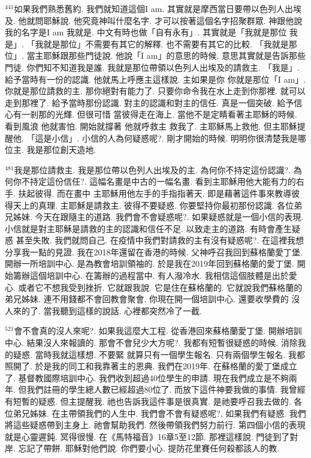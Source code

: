 \documentclass{book}
\begin{document}
$^{441}$如果我們熟悉舊約.
我們就知道這個I am.
其實就是摩西當日要帶以色列人出埃及.
他就問耶穌說.
他究竟神叫什麼名字.
才可以按著這個名字招聚群眾.
神跟他說 我的名字是I am 我就是.
中文有時也做「自有永有」.
其實就是「我就是那位 我是」.
「我就是那位」不需要有其它的解釋.
也不需要有其它的比較.
「我就是那位」.
當主耶穌跟那些門徒說.
他說「I am」的意思的時候.
意思其實就是告訴那些門徒.
你們知不知道我是誰.
我就是那位帶領以色列人出埃及的請救主.
「我是」.
給予當時有一份的認識.
他就馬上呼應主這樣說.
主如果是你 你就是那位「I am」.
你就是那位請救的主.
那你絕對有能力了.
只要你命令我在水上走到你那裡.
就可以走到那裡了.
給予當時那份認識.
對主的認識和對主的信任.
真是一個突破.
給予信心有一剎那的光輝.
但很可惜 當彼得走在海上.
當他不是定睛看著主耶穌的時候.
看到風浪 他就害怕.
開始就撐著 他就呼救主 救我了.
主耶穌馬上救他.
但主耶穌提醒他.
「這是小信」.
小信的人為何疑惑呢?.
剛才開始的時候.
明明你很清楚我是哪位主.
我是那位創天造地.

$^{481}$我是那位請救主.
我是那位帶以色列人出埃及的主.
為何你不持定這份認識?.
為何你不持定這份信任?.
這幅名畫是中古的一幅名畫.
看到主耶穌用他大能有力的右手.
扶起彼得.
而在畫中 主耶穌用他左手的手指指著天.
即是藉著這件事來教導彼得天上的真理.
主耶穌是請救主.
彼得不要疑惑.
你要堅持你最初那份認識.
各位弟兄姊妹.
今天在跟隨主的道路.
我們會不會疑惑呢?.
如果疑惑就是一個小信的表現.
小信就是對主耶穌是請救的主的認識和信任不足.
以致走主的道路.
有時會產生疑惑 甚至失敗.
我們就問自己.
在疫情中我們對請救的主有沒有疑惑呢?.
在這裡我想分享我一點的見證.
我在2018年還留在香港的時候.
父神呼召我回到蘇格蘭愛丁堡.
開辦一所培訓中心.
是為教會培訓領袖的.
於是我在2019年回到蘇格蘭的愛丁堡.
開始籌辦這個培訓中心.
在籌辦的過程當中.
有人潑冷水.
我相信這個肢體是出於愛心.
或者它不想我受到挫折.
它就跟我說.
它是住在蘇格蘭的.
它就說我們蘇格蘭的弟兄姊妹.
連不用錢都不會回教會聚會.
你現在開一個培訓中心.
還要收學費的 沒人來的了.
當我聽到這樣的說話.
心裡都突然冷了一截.

$^{521}$會不會真的沒人來呢?.
如果我這麼大工程.
從香港回來蘇格蘭愛丁堡.
開辦培訓中心.
結果沒人來報讀的.
那會不會兒少大方呢?.
我都有短暫很疑惑的時候.
消除我的疑惑.
當時我就這樣想.
不要緊 就算只有一個學生報名.
只有兩個學生報名.
我都照開了.
於是我的同工和我靠著主的恩典.
我們在2019年.
在蘇格蘭的愛丁堡成立了.
基督教國際培訓中心.
我們收到超過40位學生的申請.
現在我們成立是不夠兩年.
但我們註冊的學生總人數已經超過80位了.
而放下這件神要我做的事情.
我曾經有短暫的疑惑.
但主提醒我.
祂也告訴我這件事是很真實.
是祂要呼召我去做的.
各位弟兄姊妹.
在主帶領我們的人生中.
我們會不會有疑惑呢?.
如果我們有疑惑.
我們將這些疑惑帶到主身上.
祂會幫助我們.
然後帶領我們努力前行.
第四個小信的表現就是心靈遲鈍.
冥得很慢.
在《馬特福音》16章5至12節.
那裡這樣說.
門徒到了對岸.
忘記了帶餅.
耶穌對他們說.
你們要小心.
提防花里賽任何殺都該人的教.
\end{document}
